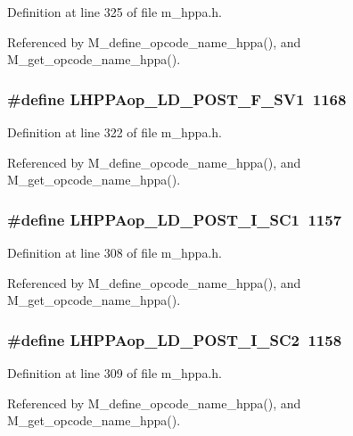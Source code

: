 Definition at line 325 of file m\_\-hppa.h.

Referenced by M\_\-define\_\-opcode\_\-name\_\-hppa(), and M\_\-get\_\-opcode\_\-name\_\-hppa().
\subsubsection{\setlength{\rightskip}{0pt plus 5cm}\#define LHPPAop\_\-LD\_\-POST\_\-F\_\-SV1~1168}\label{m__hppa_8h_bd23bf45a877720df3dd61454c669759}




Definition at line 322 of file m\_\-hppa.h.

Referenced by M\_\-define\_\-opcode\_\-name\_\-hppa(), and M\_\-get\_\-opcode\_\-name\_\-hppa().
\subsubsection{\setlength{\rightskip}{0pt plus 5cm}\#define LHPPAop\_\-LD\_\-POST\_\-I\_\-SC1~1157}\label{m__hppa_8h_b09f73c5272beaaa8530de323857383b}




Definition at line 308 of file m\_\-hppa.h.

Referenced by M\_\-define\_\-opcode\_\-name\_\-hppa(), and M\_\-get\_\-opcode\_\-name\_\-hppa().
\subsubsection{\setlength{\rightskip}{0pt plus 5cm}\#define LHPPAop\_\-LD\_\-POST\_\-I\_\-SC2~1158}\label{m__hppa_8h_8c50367d912f2678edc605d90527a60a}




Definition at line 309 of file m\_\-hppa.h.

Referenced by M\_\-define\_\-opcode\_\-name\_\-hppa(), and M\_\-get\_\-opcode\_\-name\_\-hppa().
